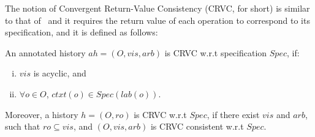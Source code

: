 The notion of Convergent Return-Value Consistency (CRVC, for short) is
similar to that of~\cite{Burckhardt:2014} and it requires the return
value of each operation to correspond to its specification, and it is
defined as follows: 

\begin{definition}
\label{definition:strong return value consistency}
An annotated history $ah = (O,\mathit{vis},\mathit{arb})$ is CRVC w.r.t specification $\mathit{Spec}$, if:
\begin{enumerate}[(i)]
\item $\mathit{vis}$ is acyclic, and
\item $\forall o \in O$, $\mathit{ctxt}(o) \in Spec(\mathit{lab}(o))$.
\end{enumerate}

Moreover, a history $h = (O,\mathit{ro})$ is CRVC w.r.t $\mathit{Spec}$, if
there exist $\mathit{vis}$ and $\mathit{arb}$, such that $\mathit{ro}
\subseteq \mathit{vis}$, and $(O,\mathit{vis},\mathit{arb})$ is CRVC
consistent w.r.t $\mathit{Spec}$.
\end{definition}


